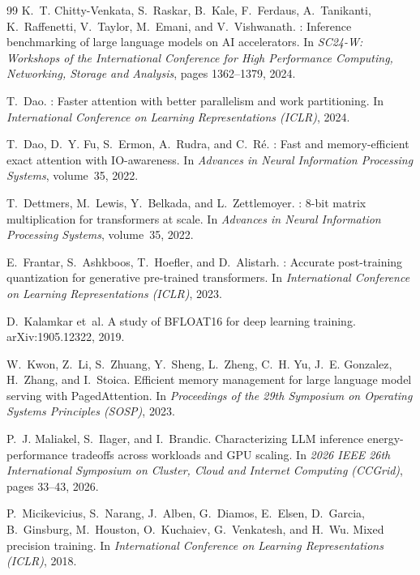 \documentclass[11pt]{article}
\begin{document}
\begin{thebibliography}{99}
K.~T. Chitty-Venkata, S.~Raskar, B.~Kale, F.~Ferdaus, A.~Tanikanti, K.~Raffenetti, V.~Taylor, M.~Emani, and V.~Vishwanath.
: Inference benchmarking of large language models on {AI} accelerators.
\newblock In {\em SC24-W: Workshops of the International Conference for High Performance Computing, Networking, Storage and Analysis}, pages 1362--1379, 2024.

T.~Dao.
: Faster attention with better parallelism and work partitioning.
\newblock In {\em International Conference on Learning Representations (ICLR)}, 2024.

T.~Dao, D.~Y. Fu, S.~Ermon, A.~Rudra, and C.~R{\'e}.
: Fast and memory-efficient exact attention with {IO}-awareness.
\newblock In {\em Advances in Neural Information Processing Systems}, volume~35, 2022.

T.~Dettmers, M.~Lewis, Y.~Belkada, and L.~Zettlemoyer.
: 8-bit matrix multiplication for transformers at scale.
\newblock In {\em Advances in Neural Information Processing Systems}, volume~35, 2022.

E.~Frantar, S.~Ashkboos, T.~Hoefler, and D.~Alistarh.
: Accurate post-training quantization for generative pre-trained transformers.
\newblock In {\em International Conference on Learning Representations (ICLR)}, 2023.

D.~Kalamkar et~al.
\newblock A study of {BFLOAT16} for deep learning training.
\newblock arXiv:1905.12322, 2019.

W.~Kwon, Z.~Li, S.~Zhuang, Y.~Sheng, L.~Zheng, C.~H. Yu, J.~E. Gonzalez, H.~Zhang, and I.~Stoica.
\newblock Efficient memory management for large language model serving with {PagedAttention}.
\newblock In {\em Proceedings of the 29th Symposium on Operating Systems Principles (SOSP)}, 2023.

P.~J. Maliakel, S.~Ilager, and I.~Brandic.
\newblock Characterizing {LLM} inference energy-performance tradeoffs across workloads and {GPU} scaling.
\newblock In {\em 2026 IEEE 26th International Symposium on Cluster, Cloud and Internet Computing (CCGrid)}, pages 33--43, 2026.

P.~Micikevicius, S.~Narang, J.~Alben, G.~Diamos, E.~Elsen, D.~Garcia, B.~Ginsburg, M.~Houston, O.~Kuchaiev, G.~Venkatesh, and H.~Wu.
\newblock Mixed precision training.
\newblock In {\em International Conference on Learning Representations (ICLR)}, 2018.


\end{thebibliography}
\end{document}
